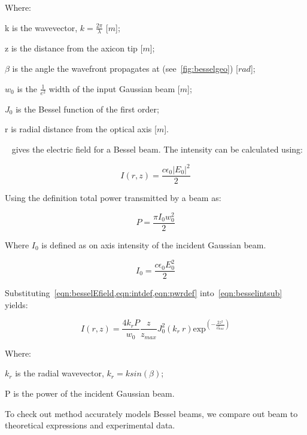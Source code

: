 \noindent Where:

    \indent k is the wavevector, $k=\tfrac{2\pi}{\lambda}$ [$m$];

    \indent z is the distance from the axicon tip [$m$]; 

    \indent $\beta$ is the angle the wavefront propagates at (see~\cref{fig:besselgeo}) [$rad$]; 

    \indent $w_0$ is the $\tfrac{1}{e^2}$ width of the input Gaussian beam [$m$]; 

    \indent $J_0$ is the Bessel function of the first order; 

    \indent r is radial distance from the optical axis [$m$]. 

\medskip


~ gives the electric field for a Bessel beam. The intensity can be calculated using:

\begin{equation}
    I(r,z)=\frac{c\epsilon_0\left|E_0\right|^2}{2}
    \label{eqn:besselintsub}
\end{equation}

Using the definition total power transmitted by a beam as:

\begin{equation}
    P=\frac{\pi I_0w_0^2}{2}
    \label{eqn:pwrdef}
\end{equation}

Where $I_0$ is defined as on axis intensity of the incident Gaussian beam.

\begin{equation}
    I_0=\frac{c\epsilon_0E_0^2}{2}
    \label{eqn:intdef}
\end{equation}

Substituting~\cref{eqn:besselEfield,eqn:intdef,eqn:pwrdef} into~\cref{eqn:besselintsub} yields:

\begin{equation}
    I(r,z)=\frac{4k_rP}{w_0}\frac{z}{z_{max}}J_0^2\left(k_r\ r\right)\text{exp}^{\left(-\frac{2z^2}{z^2_{max}}\right)}
    \label{eqn:besselInt}
\end{equation}


\noindent Where:

    \indent $k_r$ is the radial wavevector, $k_r=k sin(\beta)$;

    \indent P is the power of the incident Gaussian beam.

    \medskip

To check out method accurately models Bessel beams, we compare out beam to theoretical expressions and experimental data.

